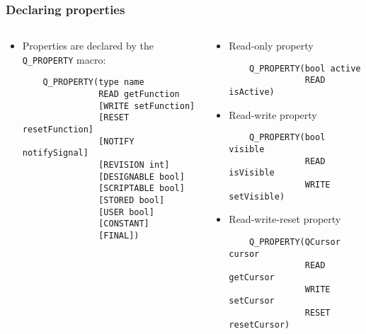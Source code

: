 \begin{frame}[fragile]
  \frametitle{Declaring properties}
  \footnotesize
  \begin{columns}
    \begin{column}{0.5\textwidth}
    \begin{itemize}
      \item Properties are declared by the \texttt{Q\_PROPERTY} macro:
      \begin{verbatim}
	Q_PROPERTY(type name
	           READ getFunction
	           [WRITE setFunction]
	           [RESET resetFunction]
	           [NOTIFY notifySignal]
	           [REVISION int]
	           [DESIGNABLE bool]
	           [SCRIPTABLE bool]
	           [STORED bool]
	           [USER bool]
	           [CONSTANT]
	           [FINAL])
      \end{verbatim}
    \end{itemize}
    \end{column}
    \begin{column}{0.5\textwidth}
    \begin{itemize}
      \item Read-only property
      \begin{verbatim}
	Q_PROPERTY(bool active
	           READ isActive)
      \end{verbatim}
      \item Read-write property
      \begin{verbatim}
	Q_PROPERTY(bool visible
	           READ isVisible
	           WRITE setVisible)
      \end{verbatim}
      \item Read-write-reset property
      \begin{verbatim}
	Q_PROPERTY(QCursor cursor
	           READ getCursor
	           WRITE setCursor
	           RESET resetCursor)
      \end{verbatim}
    \end{itemize}
    \end{column}
  \end{columns}
\end{frame}

